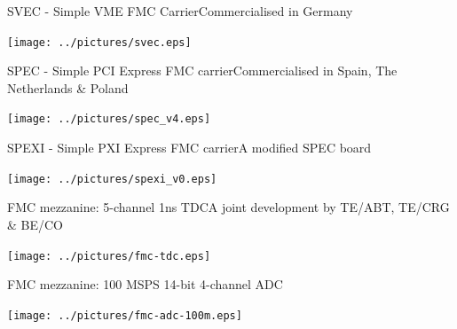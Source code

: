\documentclass[compress,red]{beamer}
\begin{document}
\begin{frame}{SVEC - Simple VME FMC Carrier}{Commercialised in Germany}

  \begin{center}
    \texttt{[image: ../pictures/svec.eps]}
  \end{center}


\end{frame}

\begin{frame}{SPEC - Simple PCI Express FMC carrier}{Commercialised in Spain, The Netherlands \& Poland}

  \begin{center}
    \texttt{[image: ../pictures/spec\_v4.eps]}
  \end{center}


\end{frame}

\begin{frame}{SPEXI - Simple PXI Express FMC carrier}{A modified SPEC board}

  \begin{center}
    \texttt{[image: ../pictures/spexi\_v0.eps]}
  \end{center}


\end{frame}

\begin{frame}{FMC mezzanine: 5-channel 1ns TDC}{A joint development by TE/ABT, TE/CRG \& BE/CO}

  \begin{center}
    \texttt{[image: ../pictures/fmc-tdc.eps]}
  \end{center}


\end{frame}

\begin{frame}{FMC mezzanine: 100 MSPS 14-bit 4-channel ADC}

  \begin{center}
    \texttt{[image: ../pictures/fmc-adc-100m.eps]}
  \end{center}


\end{frame}
\end{document}
